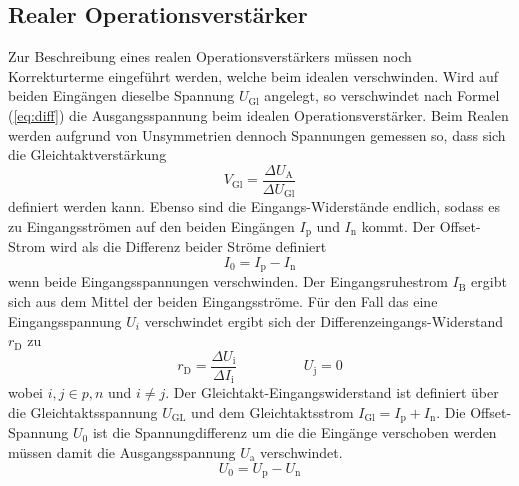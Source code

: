 \subsection{Realer Operationsverstärker}%
\label{sub:realer_operationsverstaerker}

Zur Beschreibung eines realen Operationsverstärkers müssen noch Korrekturterme 
eingeführt werden, welche beim idealen verschwinden. 
Wird auf beiden Eingängen dieselbe Spannung $U_\text{Gl}$ angelegt, so
verschwindet nach Formel (\ref{eq:diff}) die Ausgangsspannung beim idealen
Operationsverstärker. 
Beim Realen werden aufgrund von Unsymmetrien dennoch Spannungen gemessen so, dass
sich die Gleichtaktverstärkung 
\begin{equation}
		V_\text{Gl} = \frac{\Delta U_\text{A}}{\Delta U_\text{Gl}}
\end{equation}
definiert werden kann.
Ebenso sind die Eingangs-Widerstände endlich, sodass es zu Eingangsströmen auf
den beiden Eingängen $I_\text{p}$ und $I_\text{n}$ kommt.
Der Offset-Strom wird als die Differenz beider Ströme definiert 
\begin{equation}
		I_0 = I_\text{p} - I_\text{n}
\end{equation}
wenn beide Eingangsspannungen verschwinden. 
Der Eingangsruhestrom $I_\text{B}$ ergibt sich aus dem Mittel der beiden Eingangsströme.
Für den Fall das eine Eingangsspannung $U_{i}$ verschwindet ergibt sich der
Differenzeingangs-Widerstand $r_\text{D}$ zu
\begin{equation}
		r_\text{D} = \frac{\Delta U_\text{i}}{\Delta I_\text{i}} \hspace{2cm} U_\text{j} = 0 
\end{equation}
wobei $i,j \in p,n$ und $i \neq j$.
Der Gleichtakt-Eingangswiderstand ist definiert über die Gleichtaktsspannung
$U_\text{GL}$ und dem Gleichtaktsstrom $I_\text{Gl} = I_\text{p} + I_\text{n}$.
Die Offset-Spannung $U_0$ ist die Spannungdifferenz um die die Eingänge
verschoben werden müssen damit die Ausgangsspannung $U_\text{a}$ verschwindet.
\begin{equation}
		U_0 = U_\text{p} - U_\text{n}
\end{equation}

